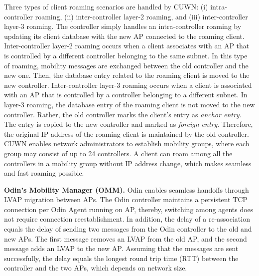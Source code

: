 Three types of client roaming scenarios are handled by CUWN: (i) intra-controller roaming, (ii) inter-controller layer-2 roaming, and (iii) inter-controller layer-3 roaming.
The controller simply handles an intra-controller roaming by updating its client database with the new AP connected to the roaming client. 
Inter-controller layer-2 roaming occurs when a client associates with an AP that is controlled by a different controller belonging to the same subnet. 
In this type of roaming, mobility messages are exchanged between the old controller and the new one. 
Then, the database entry related to the roaming client is moved to the new controller. 
Inter-controller layer-3 roaming occurs when a client is associated with an AP that is controlled by a controller belonging to a different subnet. 
In layer-3 roaming, the database entry of the roaming client is not moved to the new controller. 
Rather, the old controller marks the client's entry as \textit{anchor entry}. 
The entry is copied to the new controller and marked as \textit{foreign entry}. 
Therefore, the original IP address of the roaming client is maintained by the old controller. 
CUWN enables network administrators to establish mobility groups, where each group may consist of up to 24 controllers. 
A client can roam among all the controllers in a mobility group without IP address change, which makes seamless and fast roaming possible.




\textbf{Odin's Mobility Manager (OMM).}
\label{AMOdin}
Odin  \cite{Odin,Odin2} enables seamless handoffs through LVAP migration between APs. 
The Odin controller maintains a persistent TCP connection per Odin Agent running on AP, thereby, switching among agents does not require connection reestablishment. 
In addition, the delay of a re-association equals the delay of sending two messages from the Odin controller to the old and new APs. 
The first message removes an LVAP from the old AP, and the second message adds an LVAP to the new AP. 
Assuming that the messages are sent successfully, the delay equals the longest round trip time (RTT) between the controller and the two APs, which depends on network size. 

